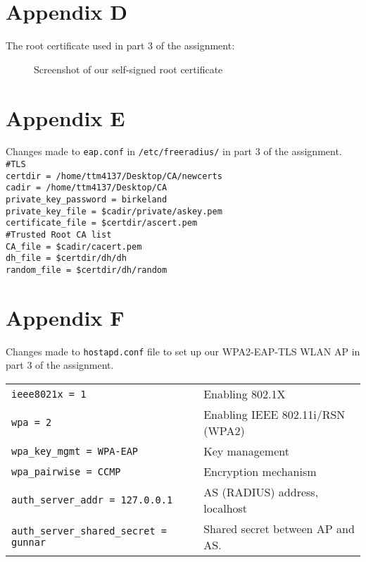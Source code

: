 \documentclass[a4paper,11pt]{article}
\begin{document}
\section*{Appendix D} \label{sec:appendixd}
The root certificate used in part 3 of the assignment: \\

\begin{figure}[h!]
\centering
{}
\caption{\label{fig:rootcert} Screenshot of our self-signed root certificate}
\end{figure}

\newpage

\section*{Appendix E} \label{sec:appendixe}
Changes made to \texttt{eap.conf} in \texttt{/etc/freeradius/} in part 3 of the assignment. \\

\noindent\texttt{\#TLS}\\
\texttt{certdir = /home/ttm4137/Desktop/CA/newcerts} \\
\texttt{cadir = /home/ttm4137/Desktop/CA} \\
\texttt{private\_key\_password = birkeland} \\
\texttt{private\_key\_file = \${cadir}/private/askey.pem} \\
\texttt{certificate\_file = \${certdir}/ascert.pem} \\

\noindent\texttt{\#Trusted Root CA list} \\
\texttt{CA\_file = \${cadir}/cacert.pem} \\
\texttt{dh\_file = \${certdir}/dh/dh} \\
\texttt{random\_file = \${certdir}/dh/random} \\

\section*{Appendix F} \label{sec:appendixf}
Changes made to \texttt{hostapd.conf} file to set up our WPA2-EAP-TLS WLAN AP in part 3 of the assignment. \\

\begin{tabular}{ll}
\texttt{ieee8021x = 1} & Enabling 802.1X \\
\texttt{wpa = 2} & Enabling IEEE 802.11i/RSN (WPA2)\\
\texttt{wpa\_key\_mgmt = WPA-EAP}  & Key management \\
\texttt{wpa\_pairwise = CCMP}  & Encryption mechanism \\
\texttt{auth\_server\_addr = 127.0.0.1} & AS (RADIUS) address, localhost \\
\texttt{auth\_server\_shared\_secret = gunnar} & Shared secret between AP and AS.
\end{tabular}
\end{document}
